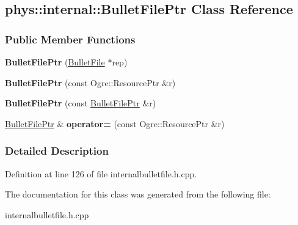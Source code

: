 \hypertarget{classphys_1_1internal_1_1BulletFilePtr}{
\subsection{phys::internal::BulletFilePtr Class Reference}
\label{classphys_1_1internal_1_1BulletFilePtr}
}
\subsubsection*{Public Member Functions}
\begin{DoxyCompactItemize}
\item 
\hypertarget{classphys_1_1internal_1_1BulletFilePtr_a63b21053a6a9da4dfe722dee7ed3c4cf}{
{\bfseries BulletFilePtr} (\hyperlink{classphys_1_1internal_1_1BulletFile}{BulletFile} $\ast$rep)}
\label{classphys_1_1internal_1_1BulletFilePtr_a63b21053a6a9da4dfe722dee7ed3c4cf}

\item 
\hypertarget{classphys_1_1internal_1_1BulletFilePtr_aa8c26e0d2ae6d61e61c626cd0e468e14}{
{\bfseries BulletFilePtr} (const Ogre::ResourcePtr \&r)}
\label{classphys_1_1internal_1_1BulletFilePtr_aa8c26e0d2ae6d61e61c626cd0e468e14}

\item 
\hypertarget{classphys_1_1internal_1_1BulletFilePtr_ac5c6ddc636686aeb9ed294fa7782c32c}{
{\bfseries BulletFilePtr} (const \hyperlink{classphys_1_1internal_1_1BulletFilePtr}{BulletFilePtr} \&r)}
\label{classphys_1_1internal_1_1BulletFilePtr_ac5c6ddc636686aeb9ed294fa7782c32c}

\item 
\hypertarget{classphys_1_1internal_1_1BulletFilePtr_a5d283546eaf1a58668389fe5e913166a}{
\hyperlink{classphys_1_1internal_1_1BulletFilePtr}{BulletFilePtr} \& {\bfseries operator=} (const Ogre::ResourcePtr \&r)}
\label{classphys_1_1internal_1_1BulletFilePtr_a5d283546eaf1a58668389fe5e913166a}

\end{DoxyCompactItemize}


\subsubsection{Detailed Description}


Definition at line 126 of file internalbulletfile.h.cpp.



The documentation for this class was generated from the following file:\begin{DoxyCompactItemize}
\item 
internalbulletfile.h.cpp\end{DoxyCompactItemize}
